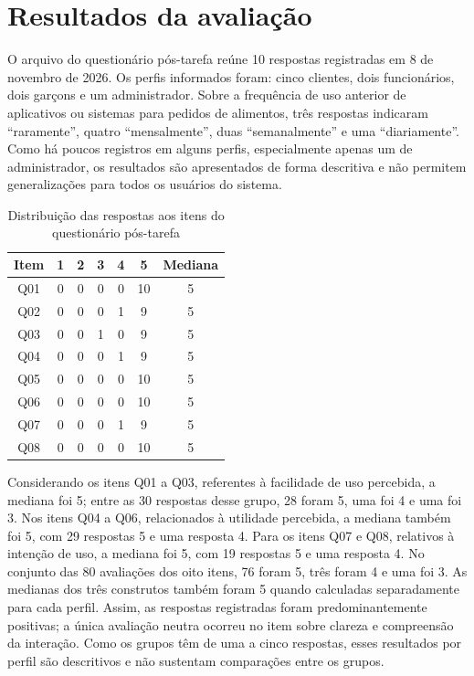 \section{Resultados da avaliação}

O arquivo do questionário pós-tarefa reúne 10 respostas registradas em 8 de novembro de 2026. Os perfis informados foram: cinco clientes, dois funcionários, dois garçons e um administrador. Sobre a frequência de uso anterior de aplicativos ou sistemas para pedidos de alimentos, três respostas indicaram “raramente”, quatro “mensalmente”, duas “semanalmente” e uma “diariamente”. Como há poucos registros em alguns perfis, especialmente apenas um de administrador, os resultados são apresentados de forma descritiva e não permitem generalizações para todos os usuários do sistema.

\begin{table}[htbp]
\centering
\caption{Distribuição das respostas aos itens do questionário pós-tarefa}
\label{tab:resultados-tam}
\small
\begin{tabular}{c|c|c|c|c|c|c}
\hline
\textbf{Item} & \textbf{1} & \textbf{2} & \textbf{3} & \textbf{4} & \textbf{5} & \textbf{Mediana} \\
\hline
Q01 & 0 & 0 & 0 & 0 & 10 & 5 \\
\hline
Q02 & 0 & 0 & 0 & 1 & 9 & 5 \\
\hline
Q03 & 0 & 0 & 1 & 0 & 9 & 5 \\
\hline
Q04 & 0 & 0 & 0 & 1 & 9 & 5 \\
\hline
Q05 & 0 & 0 & 0 & 0 & 10 & 5 \\
\hline
Q06 & 0 & 0 & 0 & 0 & 10 & 5 \\
\hline
Q07 & 0 & 0 & 0 & 1 & 9 & 5 \\
\hline
Q08 & 0 & 0 & 0 & 0 & 10 & 5 \\
\hline
\end{tabular}
\normalsize
{}
\end{table}

Considerando os itens Q01 a Q03, referentes à facilidade de uso percebida, a mediana foi 5; entre as 30 respostas desse grupo, 28 foram 5, uma foi 4 e uma foi 3. Nos itens Q04 a Q06, relacionados à utilidade percebida, a mediana também foi 5, com 29 respostas 5 e uma resposta 4. Para os itens Q07 e Q08, relativos à intenção de uso, a mediana foi 5, com 19 respostas 5 e uma resposta 4. No conjunto das 80 avaliações dos oito itens, 76 foram 5, três foram 4 e uma foi 3. As medianas dos três construtos também foram 5 quando calculadas separadamente para cada perfil. Assim, as respostas registradas foram predominantemente positivas; a única avaliação neutra ocorreu no item sobre clareza e compreensão da interação. Como os grupos têm de uma a cinco respostas, esses resultados por perfil são descritivos e não sustentam comparações entre os grupos.

